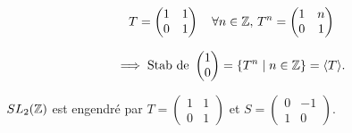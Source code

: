 \[ T = \begin{pmatrix} 1 & 1 \\ 0 & 1 \end{pmatrix} \quad \forall n \in \mathbb{Z}, \, T^n = \begin{pmatrix} 1 & n \\ 0 & 1 \end{pmatrix} \]

\[ \implies \text{Stab de } \begin{pmatrix} 1 \\ 0 \end{pmatrix} = \{ T^n \mid n \in \mathbb{Z} \} = \langle T \rangle. \]


\begin{theoreme}{}{}
    $SL_2(\mathbb{Z})$ est engendré par $T = \begin{pmatrix} 1 & 1 \\ 0 & 1 \end{pmatrix}$ et $S = \begin{pmatrix} 0 & -1 \\ 1 & 0 \end{pmatrix}$.
\end{theoreme}

